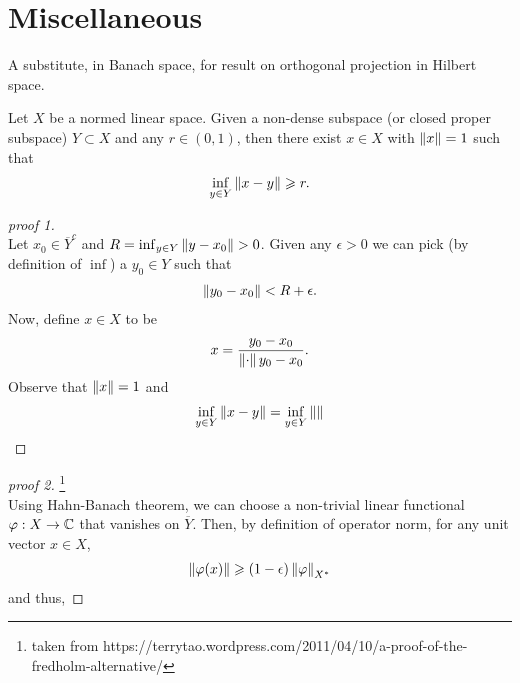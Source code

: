 \documentclass{article}
\begin{document}
\section{Miscellaneous}
A substitute, in Banach space, for result on orthogonal projection in Hilbert space. 
\begin{flemma}
Let $X$ be a normed linear space. Given a non-dense subspace (or closed proper subspace) $Y \subset X$ and any $r \in (0, 1)$, then there exist $x \in X$ with $\norm[x] = 1$ such that 
\begin{align*}
\inf_{y \in Y} \norm[x - y] \geq r. 
\end{align*}
\end{flemma}


\begin{proof}[proof 1] \hfill \\
Let $x_0 \in \overline{Y}^c$ and $R = \inf_{y \in Y}\norm[y - x_0] > 0$. Given any $\epsilon > 0$ we can pick (by definition of $\inf$) a $y_0 \in Y$ such that 
\begin{align*}
\norm[y_0 - x_0] < R + \epsilon. 
\end{align*}
Now, define $x \in X$ to be
\begin{align*}
x = \frac{y_0 - x_0}{\norm{y_0 - x_0}}. 
\end{align*}
Observe that $\norm[x] = 1$ and 
\begin{align*}
\inf_{y \in Y} \norm[x - y] = \inf_{y \in Y} \norm[]
\end{align*}
\end{proof}

\begin{proof}[proof 2]\footnote{taken from {https://terrytao.wordpress.com/2011/04/10/a-proof-of-the-fredholm-alternative/}} \hfill \\
Using Hahn-Banach theorem, we can choose a non-trivial linear functional $\varphi: X \to \C$ that vanishes on $\overline{Y}$. Then, by definition of operator norm, for any unit vector $x \in X$, 
\begin{align*}
\norm[\varphi(x)] \geq (1- \epsilon) \norm[\varphi]_{X^*}
\end{align*}
and thus, 
\end{proof}






\end{document}
